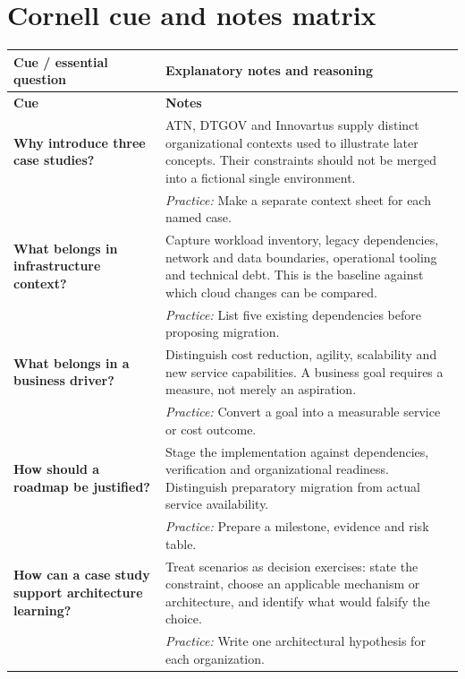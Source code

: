 \documentclass[10pt,letterpaper]{article}
\begin{document}
\section{Cornell cue and notes matrix}
\small\setlength{\LTleft}{0pt}\setlength{\LTright}{0pt plus 1fill}
\begin{longtable}{>{\RaggedRight\arraybackslash}p{}>{\RaggedRight\arraybackslash}p{}}
\toprule\textbf{Cue / essential question}&\textbf{Explanatory notes and reasoning}\\\midrule\endfirsthead\toprule\textbf{Cue}&\textbf{Notes}\\\midrule\endhead
\textbf{Why introduce three case studies?} & ATN, DTGOV and Innovartus supply distinct organizational contexts used to illustrate later concepts. Their constraints should not be merged into a fictional single environment.\\[3pt]& \textcolor{petrol}{\emph{Practice:} Make a separate context sheet for each named case.}\\[8pt]\midrule
\textbf{What belongs in infrastructure context?} & Capture workload inventory, legacy dependencies, network and data boundaries, operational tooling and technical debt. This is the baseline against which cloud changes can be compared.\\[3pt]& \textcolor{petrol}{\emph{Practice:} List five existing dependencies before proposing migration.}\\[8pt]\midrule
\textbf{What belongs in a business driver?} & Distinguish cost reduction, agility, scalability and new service capabilities. A business goal requires a measure, not merely an aspiration.\\[3pt]& \textcolor{petrol}{\emph{Practice:} Convert a goal into a measurable service or cost outcome.}\\[8pt]\midrule
\textbf{How should a roadmap be justified?} & Stage the implementation against dependencies, verification and organizational readiness. Distinguish preparatory migration from actual service availability.\\[3pt]& \textcolor{petrol}{\emph{Practice:} Prepare a milestone, evidence and risk table.}\\[8pt]\midrule
\textbf{How can a case study support architecture learning?} & Treat scenarios as decision exercises: state the constraint, choose an applicable mechanism or architecture, and identify what would falsify the choice.\\[3pt]& \textcolor{petrol}{\emph{Practice:} Write one architectural hypothesis for each organization.}\\[8pt]\midrule
\end{longtable}\normalsize
\end{document}
